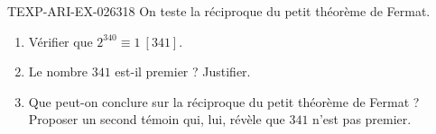 \begin{exercice}{TEXP-ARI-EX-026}{3}{18}
On teste la réciproque du petit théorème de Fermat.
\begin{enumerate}
  \item Vérifier que $2^{340}\equiv1\ [341]$.
  \item Le nombre $341$ est-il premier ? Justifier.
  \item Que peut-on conclure sur la réciproque du petit théorème de Fermat ?
        Proposer un second témoin qui, lui, révèle que $341$ n'est pas premier.
\end{enumerate}
\end{exercice}
